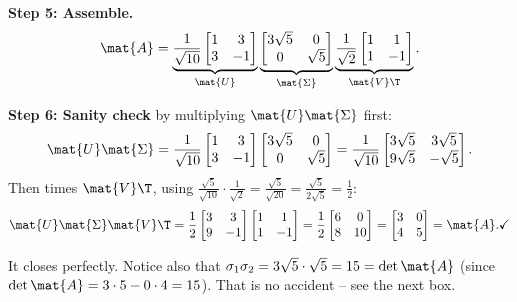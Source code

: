 \textbf{Step 5: Assemble.}
\[
  \mat{A}
  = \underbrace{\frac{1}{\sqrt{10}}\begin{bmatrix} 1 & 3 \\ 3 & -1 \end{bmatrix}}_{\mat{U}}
    \underbrace{\begin{bmatrix} 3\sqrt5 & 0 \\ 0 & \sqrt5 \end{bmatrix}}_{\mat{\Sigma}}
    \underbrace{\frac{1}{\sqrt2}\begin{bmatrix} 1 & 1 \\ 1 & -1 \end{bmatrix}}_{\mat{V}\T}.
\]

\textbf{Step 6: Sanity check} by multiplying $\mat{U}\mat{\Sigma}$ first:
\[
  \mat{U}\mat{\Sigma}
  = \frac{1}{\sqrt{10}}\begin{bmatrix} 1 & 3 \\ 3 & -1 \end{bmatrix}
    \begin{bmatrix} 3\sqrt5 & 0 \\ 0 & \sqrt5 \end{bmatrix}
  = \frac{1}{\sqrt{10}}\begin{bmatrix} 3\sqrt5 & 3\sqrt5 \\ 9\sqrt5 & -\sqrt5 \end{bmatrix}.
\]
Then times $\mat{V}\T$, using $\frac{\sqrt5}{\sqrt{10}}\cdot\frac{1}{\sqrt2} =
\frac{\sqrt5}{\sqrt{20}} = \frac{\sqrt5}{2\sqrt5} = \frac12$:
\[
  \mat{U}\mat{\Sigma}\mat{V}\T
  = \frac12\begin{bmatrix} 3 & 3 \\ 9 & -1 \end{bmatrix}
           \begin{bmatrix} 1 & 1 \\ 1 & -1 \end{bmatrix}
  = \frac12\begin{bmatrix} 6 & 0 \\ 8 & 10 \end{bmatrix}
  = \begin{bmatrix} 3 & 0 \\ 4 & 5 \end{bmatrix} = \mat{A}. \checkmark
\]

It closes perfectly. Notice also that $\sigma_1\sigma_2 = 3\sqrt5\cdot\sqrt5 = 15
= \det\mat{A}$ (since $\det\mat{A} = 3\cdot5 - 0\cdot4 = 15$). That is no
accident -- see the next box.

